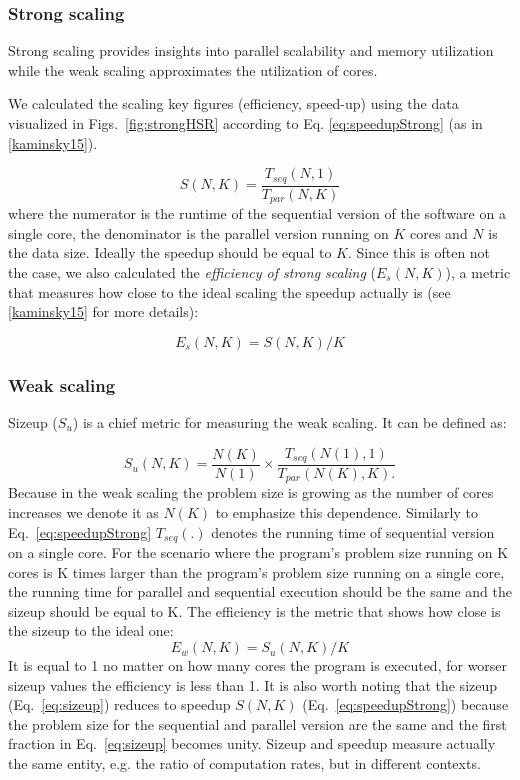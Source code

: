 \documentclass[3p,times]{elsarticle}
\begin{document}
\subsubsection{Strong scaling}
Strong scaling provides insights into parallel scalability and memory utilization while the weak scaling approximates the utilization of cores.

 We calculated the scaling key figures (efficiency, speed-up) using the data visualized in Figs.~\ref{fig:strongHSR} according to Eq. \ref{eq:speedupStrong} (as in \ref{kaminsky15}).

\begin{equation}
\label{eq:speedupStrong}
S(N,K) = \frac{T_{seq}(N,1)}{T_{par}(N,K)}
\end{equation}
where the numerator is the runtime of the sequential version of the software on a single core, the denominator is the parallel version running on $K$ cores and $N$ is the data size. Ideally the speedup should be equal to $K$. Since this is often not the case, we also calculated the \textit{efficiency of strong scaling} ($E_s(N,K)$), a metric that measures how close to the ideal scaling the speedup actually is (see \ref{kaminsky15} for more details):

$$
E_s(N,K) = S(N,K) / K
$$
 
\subsubsection{Weak scaling}


Sizeup ($S_u$) is a chief metric for measuring the weak scaling. It can be defined as: 

\begin{equation}
\label{eq:sizeup}
S_u(N,K) = \frac{N(K)}{N(1)} \times \frac{T_{seq}(N(1),1)}{T_{par}(N(K),K).}
\end{equation}
Because in the weak scaling the problem size is growing as the number of cores increases we denote it as $N(K)$ to emphasize this dependence. Similarly to Eq.~\ref{eq:speedupStrong} $T_{seq}(.)$ denotes the running time of sequential version on a single core. For the scenario where the program's problem size running on K cores is K times larger than the program's problem size running on a single core, the running time for parallel and sequential execution should be the same and the sizeup should be equal to K. The efficiency is the metric that shows how close is the sizeup to the ideal one: 
$$
E_w(N,K) = S_u(N,K) / K
$$
It is equal to 1 no matter on how many cores the program is executed, for worser sizeup values the efficiency is less than 1. It is also worth noting that the sizeup (Eq.~\ref{eq:sizeup}) reduces to speedup $S(N,K)$ (Eq.~\ref{eq:speedupStrong}) because the problem size for the sequential and parallel version are the same and the first fraction in Eq.~\ref{eq:sizeup} becomes unity. Sizeup and speedup measure actually the same entity, e.g. the ratio of computation rates, but in different contexts.
\end{document}

